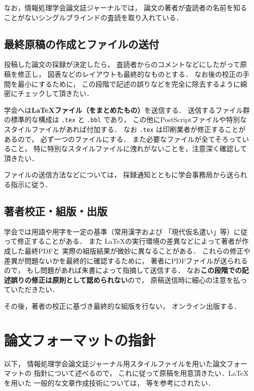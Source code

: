 \documentclass[submit, uplatex]{ipsj}
\def\|{\verb|}
\begin{document}
なお，情報処理学会論文誌ジャーナルでは，
論文の著者が査読者の名前を知ることがないシングルブラインドの査読を取り入れている．




%2.3
\subsection{最終原稿の作成とファイルの送付}

投稿した論文の採録が決定したら，
査読者からのコメントなどにしたがって原稿を修正し，
図表などのレイアウトも最終的なものとする．
なお後の校正の手間を最小にするために，
この段階で記述の誤りなどを完全に除去するように綿密にチェックして頂きたい．



学会へは{\bf \LaTeX ファイル（をまとめたもの）}を送信する．
送信するファイル群の標準的な構成は \|.tex| と \|.bbl| であり，
この他にPostScriptファイルや特別なスタイルファイルがあれば付加する．
なお \|.tex| は印刷業者が修正することがあるので，
{必ず一つのファイルにする}．
また必要なファイルが全てそろっていること，
特に特別なスタイルファイルに洩れがないことを，注意深く確認して頂きたい．


ファイルの送信方法などについては，
採録通知とともに学会事務局から送られる指示に従う．




\subsection{著者校正・組版・出版}


学会では用語や用字を一定の基準（常用漢字および
「現代仮名遣い」等）に従って修正することがある．
また \LaTeX の実行環境の差異などによって著者が作成した最終PDFと
実際の組版結果が微妙に異なることがある．
これらの修正や差異が問題ないかを最終的に確認するために，
著者にPDFファイルが送られるので，
もし問題があれば朱書によって指摘して送信する．
なお{\bf この段階での記述誤りの修正は原則として認められない}ので，
原稿送信時に細心の注意を払っていただきたい．


その後，著者の校正に基づき最終的な組版を行ない，
オンライン出版する．




\section{論文フォーマットの指針}
\label{sec:format}

以下，
情報処理学会論文誌ジャーナル用スタイルファイルを用いた論文フォーマットの
指針について述べるので，
これに従って原稿を用意頂きたい．\LaTeX を用いた
一般的な文章作成技術については，\cite{okumura, companion} 等を参考にされたい．
\end{document}
